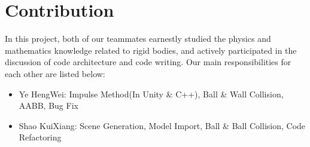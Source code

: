 \documentclass[acmtog]{acmart}
\begin{document}
\section{Contribution}
In this project, both of our teammates earnestly studied the physics and mathematics knowledge related to rigid bodies, and actively participated in the discussion of code architecture and code writing. Our main responsibilities for each other are listed below:
\begin{itemize}
	\item Ye HengWei: Impulse Method(In Unity \& C++), Ball \& Wall Collision, AABB, Bug Fix
	\item Shao KuiXiang: Scene Generation, Model Import, Ball \& Ball Collision, Code Refactoring
\end{itemize}
\end{document}
